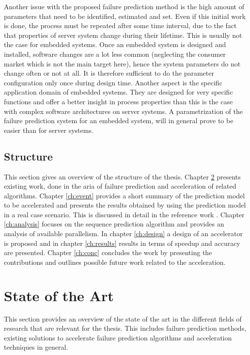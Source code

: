 \documentclass[mscthesis]{usiinfthesis}
\begin{document}
Another issue with the proposed failure prediction method is the high amount of
parameters that need to be identified, estimated and set. Even if this initial
work is done, the process must be repeated after some time interval, due to the
fact that properties of server system change during their lifetime. This is
usually not the case for embedded systems. Once an embedded system is designed
and installed, software changes are a lot less common (neglecting the consumer
market which is not the main target here), hence the system parameters do not
change often or not at all. It is therefore sufficient to do the parameter
configuration only once during design time. Another aspect is the specific
application domain of embedded systems. They are designed for very specific
functions and offer a better insight in process properties than this is the
case with complex software architectures on server systems. A parametrization
of the failure prediction system for an embedded system, will in general prove
to be easier than for server systems.

\section{Structure}
\label{ch:intro_struct}

This section gives an overview of the structure of the thesis. Chapter
\ref{ch:art} presents existing work, done in the aria of failure prediction and
acceleration of related algorithms. Chapter \ref{ch:event} provides a short
summary of the prediction model to be accelerated and presents the results
obtained by using the prediction model in a real case scenario. This is
discussed in detail in the reference work \cite{salfner08}. Chapter
\ref{ch:analysis} focuses on the sequence prediction algorithm and provides an
analysis of available parallelism. In chapter \ref{ch:design} a design of an
accelerator is proposed and in chapter \ref{ch:results} results in terms of
speedup and accuracy are presented.  Chapter \ref{ch:conc} concludes the work
by presenting the contributions and outlines possible future work related to
the acceleration.

\chapter{State of the Art}
\label{ch:art}
This section provides an overview of the state of the art in the different
fields of research that are relevant for the thesis. This includes failure
prediction methods, existing solutions to accelerate failure prediction
algorithms and acceleration techniques in general.
\end{document}

